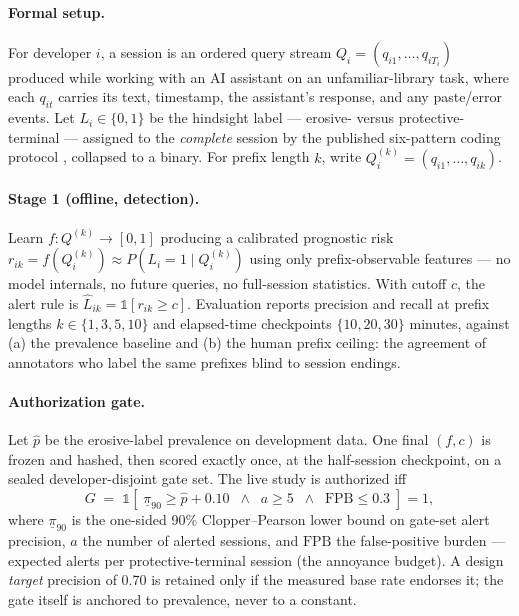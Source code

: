 \documentclass[11pt]{article}
\newcommand{\FPB}{\mathrm{FPB}}
\begin{document}
\paragraph{Formal setup.}
For developer $i$, a session is an ordered query stream $Q_i = (q_{i1}, \ldots, q_{iT_i})$ produced while working with an AI assistant on an unfamiliar-library task, where each $q_{it}$ carries its text, timestamp, the assistant's response, and any paste/error events. Let $L_i \in \{0,1\}$ be the hindsight label --- erosive- versus protective-terminal --- assigned to the \emph{complete} session by the published six-pattern coding protocol \citep{shen2026skill}, collapsed to a binary. For prefix length $k$, write $Q_i^{(k)} = (q_{i1}, \ldots, q_{ik})$.

\paragraph{Stage 1 (offline, detection).}
Learn $f: Q^{(k)} \to [0,1]$ producing a calibrated prognostic risk $r_{ik} = f(Q_i^{(k)}) \approx P(L_i = 1 \mid Q_i^{(k)})$ using only prefix-observable features --- no model internals, no future queries, no full-session statistics. With cutoff $c$, the alert rule is $\hat{L}_{ik} = \mathbb{1}[r_{ik} \geq c]$. Evaluation reports precision and recall at prefix lengths $k \in \{1,3,5,10\}$ and elapsed-time checkpoints $\{10, 20, 30\}$ minutes, against (a) the prevalence baseline and (b) the human prefix ceiling: the agreement of annotators who label the same prefixes blind to session endings.

\paragraph{Authorization gate.}
Let $\hat{p}$ be the erosive-label prevalence on development data. One final $(f, c)$ is frozen and hashed, then scored exactly once, at the half-session checkpoint, on a sealed developer-disjoint gate set. The live study is authorized iff
\begin{equation}
G \;=\; \mathbb{1}\!\left[\; \underline{\pi}_{90} \geq \hat{p} + 0.10 \;\;\wedge\;\; a \geq 5 \;\;\wedge\;\; \FPB \leq 0.3 \;\right] = 1,
\label{eq:gate}
\end{equation}
where $\underline{\pi}_{90}$ is the one-sided 90\% Clopper--Pearson lower bound \citep{clopper1934use} on gate-set alert precision, $a$ the number of alerted sessions, and $\FPB$ the false-positive burden --- expected alerts per protective-terminal session (the annoyance budget). A design \emph{target} precision of 0.70 is retained only if the measured base rate endorses it; the gate itself is anchored to prevalence, never to a constant.
\end{document}
